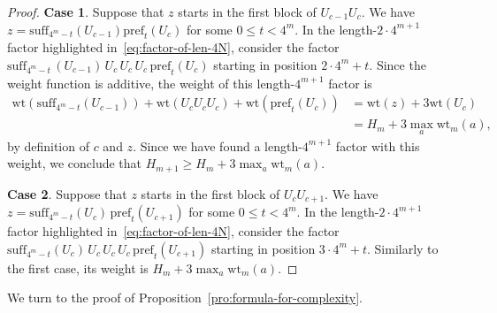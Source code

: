 \documentclass[12pt]{article}
\theoremstyle{plain}
\theoremstyle{definition}
\theoremstyle{remark}
\numberwithin{equation}{section}
\newcommand{\weight}{\mathrm{wt}}
\newcommand{\pref}{\mathrm{pref}}
\newcommand{\suff}{\mathrm{suff}}
\begin{document}
\begin{proof}
\bigskip\noindent\textbf{Case 1}. Suppose that $z$ starts in the first block of $U_{c-1}U_c$.
We have $z=\suff_{4^m-t}(U_{c-1})\pref_t(U_c)$ for some $0\le t<4^m$.
In the length-$2\cdot 4^{m+1}$ factor highlighted in~\eqref{eq:factor-of-len-4N}, consider the factor $\suff_{4^m-t}\,(U_{c-1})\,U_c\,U_c\,U_c\,\pref_t(U_c)$ starting in position $2 \cdot 4^m+t$.
Since the weight function is additive, the weight of this length-$4^{m+1}$ factor is 
\begin{align*}
\weight(\suff_{4^m-t}(U_{c-1}))+\weight(U_cU_cU_c)+\weight(\pref_t(U_c))
&= \weight(z) + 3\weight(U_c)\\
&= H_m + 3 \max_a \weight_m(a),
\end{align*}
by definition of $c$ and $z$. Since we have found a length-$4^{m+1}$ factor with this weight, we conclude that $H_{m+1}\ge H_m+3\max_a \weight_m(a)$.

\bigskip\noindent\textbf{Case 2}. Suppose that $z$ starts in the first block of $U_cU_{c+1}$.
We have $z=\suff_{4^m-t} (U_c)\, \pref_t(U_{c+1})$ for some $0\le t<4^m$.
In the length-$2\cdot 4^{m+1}$ factor highlighted in~\eqref{eq:factor-of-len-4N}, consider the factor $\suff_{4^m-t}(U_c) \,U_c\, U_c \,U_c\, \pref_t(U_{c+1})$ starting in position $3 \cdot 4^m+t$.
Similarly to the first case, its weight is $H_m + 3 \max_a \weight_m(a)$.
\end{proof}

We turn to the proof of Proposition~\ref{pro:formula-for-complexity}.
\end{document}
